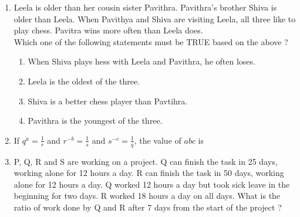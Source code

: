 \documentclass[journal]{IEEEtran}
\begin{document}
\begin{enumerate}
		(ii) He felt that when in need of help, his friends would let him down. \\
		(iii) He was sure that his friends would help him when in need. \\
		(iv) His friends did not help him last week.
		\begin{enumerate}
		\end{enumerate}
	\item Leela is older than her cousin sister Pavithra. Pavithra's brother Shiva is older than Leela. When Pavithya and Shiva are visiting Leela, all three like to play chess. Pavitra wins more often than Leela does. \\
		Which one of the following statements must be TRUE based on the above ?
		\begin{enumerate}
			\item When Shiva plays hess with Leela and Pavithra, he often loses.
			\item Leela is the oldest of the three.
			\item Shiva is a better chess player than Pavtihra.
			\item Pavithra is the youngest of the three.
		\end{enumerate}
	\item If $q^a = \frac{1}{r} $ and $r^{-b} = \frac{1}{s}$ and $s^{-c}=\frac{1}{q}$, the value of $abc$ is 
		\begin{enumerate}
		\end{enumerate}
	\item P, Q, R and S are working on a project. Q can finish the task in 25 days, working alone for 12 hours a day. R can finish the task in 50 days, working alone for 12 hours a day. Q worked 12 hours a day but took sick leave in the beginning for two days. R worked 18 hours a day on all days. What is the ratio of work done by Q and R after 7 days from the start of the project ?

\end{enumerate}
\end{document}
